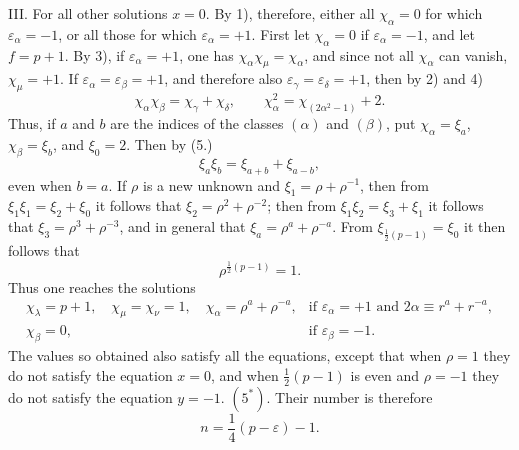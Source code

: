 \documentclass[11pt]{article}
\begin{document}
III. For all other solutions $x=0$. By 1), therefore, either all $\chi_\alpha=0$ for which $\varepsilon_\alpha=-1$, or all those for which $\varepsilon_\alpha=+1$. First let $\chi_\alpha=0$ if $\varepsilon_\alpha=-1$, and let $f=p+1$. By 3), if $\varepsilon_\alpha=+1$, one has $\chi_\alpha\chi_\mu=\chi_\alpha$, and since not all $\chi_\alpha$ can vanish, $\chi_\mu=+1$. If $\varepsilon_\alpha=\varepsilon_\beta=+1$, and therefore also $\varepsilon_\gamma=\varepsilon_\delta=+1$, then by 2) and 4)
\[
\chi_\alpha\chi_\beta=\chi_\gamma+\chi_\delta,\qquad
\chi_\alpha^2=\chi_{(2\alpha^2-1)}+2.
\]
Thus, if $a$ and $b$ are the indices of the classes $(\alpha)$ and $(\beta)$, put $\chi_\alpha=\xi_a$, $\chi_\beta=\xi_b$, and $\xi_0=2$. Then by (5.)
\[
\xi_a\xi_b=\xi_{a+b}+\xi_{a-b},
\]
even when $b=a$. If $\rho$ is a new unknown and $\xi_1=\rho+\rho^{-1}$, then from $\xi_1\xi_1=\xi_2+\xi_0$ it follows that $\xi_2=\rho^2+\rho^{-2}$; then from $\xi_1\xi_2=\xi_3+\xi_1$ it follows that $\xi_3=\rho^3+\rho^{-3}$, and in general that $\xi_a=\rho^a+\rho^{-a}$. From $\xi_{\frac12(p-1)}=\xi_0$ it then follows that
\begin{equation*}\tag{9.}
\rho^{\frac12(p-1)}=1.
\end{equation*}
Thus one reaches the solutions
\[
\begin{array}{ll}
\chi_\lambda=p+1,\quad \chi_\mu=\chi_\nu=1,\quad
\chi_\alpha=\rho^a+\rho^{-a},&
\text{if }\varepsilon_\alpha=+1\text{ and }2\alpha\equiv r^a+r^{-a},\\
\chi_\beta=0,&
\text{if }\varepsilon_\beta=-1.
\end{array}
\]
The values so obtained also satisfy all the equations, except that when $\rho=1$ they do not satisfy the equation $x=0$, and when $\frac12(p-1)$ is even and $\rho=-1$ they do not satisfy the equation $y=-1$. $(5^*)$. Their number is therefore
\begin{equation*}\tag{10.}
n=\frac14(p-\varepsilon)-1.
\end{equation*}
\end{document}
